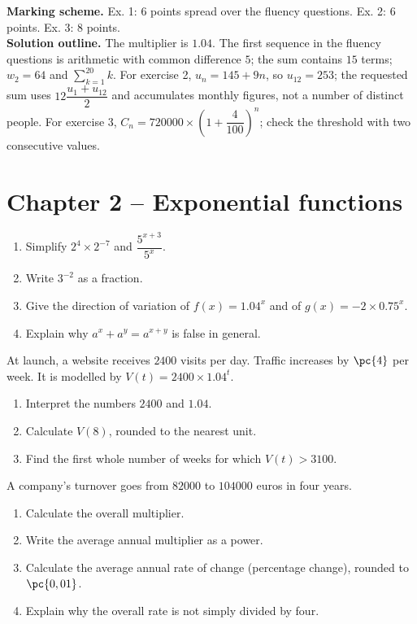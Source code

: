 \begin{solution}\textbf{Marking scheme.} Ex. 1: 6 points spread over the fluency questions. Ex. 2: 6 points. Ex. 3: 8 points.\\
\textbf{Solution outline.} The multiplier is $\num{1,04}$. The first sequence in the fluency questions is arithmetic with common difference $5$; the sum contains $15$ terms; $w_2=64$ and $\sum_{k=1}^{20}k$. For exercise 2, $u_n=145+9n$, so $u_{12}=253$; the requested sum uses $12\dfrac{u_1+u_{12}}2$ and accumulates monthly figures, not a number of distinct people. For exercise 3, $C_n=\num{720000}\times\left(1+\dfrac{4}{100}\right)^n$; check the threshold with two consecutive values.\end{solution}

\section*{Chapter 2 -- Exponential functions}
\begin{exercise}
\begin{enumerate}
\item Simplify $2^4\times2^{-7}$ and $\dfrac{5^{x+3}}{5^x}$.
\item Write $3^{-2}$ as a fraction.
\item Give the direction of variation of $f(x)=\num{1,04}^x$ and of $g(x)=-2\times\num{0,75}^x$.
\item Explain why $a^x+a^y=a^{x+y}$ is false in general.
\end{enumerate}
\end{exercise}
\begin{exercise}
At launch, a website receives $2400$ visits per day. Traffic increases by $\pc{4}$ per week. It is modelled by $V(t)=2400\times\num{1,04}^t$.
\begin{enumerate}
\item Interpret the numbers $2400$ and $\num{1,04}$.
\item Calculate $V(8)$, rounded to the nearest unit.
\item Find the first whole number of weeks for which $V(t)>3100$.
\end{enumerate}
\end{exercise}
\begin{exercise}
A company's turnover goes from $\num{82000}$ to $104000$ euros in four years.
\begin{enumerate}
\item Calculate the overall multiplier.
\item Write the average annual multiplier as a power.
\item Calculate the average annual rate of change (percentage change), rounded to $\pc{0,01}$.
\item Explain why the overall rate is not simply divided by four.
\end{enumerate}
\end{exercise}

